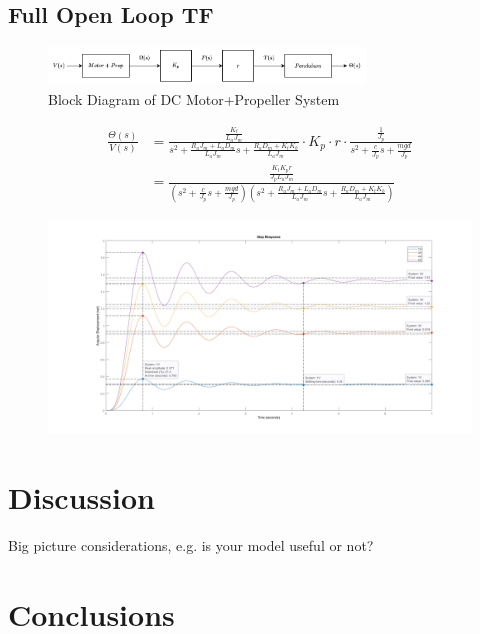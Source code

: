 \documentclass[a4paper,11pt]{article}
\begin{document}
\newpage
\subsection*{Full Open Loop TF}
\begin{figure}[h]
        \centering
        \includegraphics[width=0.75\textwidth]{inc/openloop_diagram.png}
        \caption{Block Diagram of DC Motor+Propeller System}
        \label{}
\end{figure}

\begin{align*}
        \frac{\Theta(s)}{V(s)} &= \frac{\frac{K_t}{L_aJ_m}}{s^2 + \frac{R_{a}J_{m} + L_{a}D_{m}}{L_{a}J_{m}}s + \frac{R_aD_m + K_tK_b}{L_aJ_m}} \cdot K_{p} \cdot r \cdot \frac{\frac{1}{J_{p}}}{s^{2} + \frac{c}{J_{p}}s + \frac{mgd}{J_{p}}} \\
        &= \frac{\frac{K_tK_pr}{J_pL_aJ_m}}{(s^2+\frac{c}{J_p}s+\frac{mgd}{J_p})(s^2+\frac{R_aJ_m+L_aD_m}{L_aJ_m}s+\frac{R_aD_m+K_tK_b}{L_aJ_m})}
\end{align*}



\begin{figure}[h]
        \centering
        \includegraphics[width=\textwidth]{inc/combined_sys.png}
        \caption{}
        \label{}
\end{figure}

\newpage
\section{Discussion}
Big picture considerations, e.g. is your model useful or not?
\newpage
\section{Conclusions}
\end{document}
